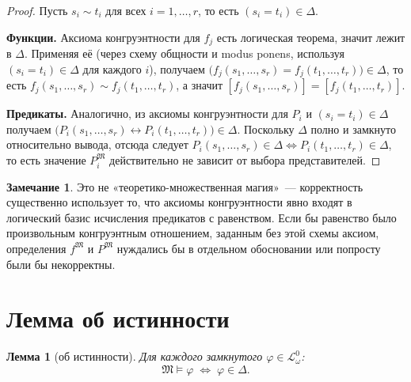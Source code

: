 \documentclass[12pt, a4paper]{article}
\theoremstyle{plain}
\newtheorem{lemma}[theorem]{Лемма}
\theoremstyle{definition}
\newtheorem{remark}[theorem]{Замечание}
\renewcommand{\models}{\vDash}
\newcommand{\Lw}{\mathcal{L}_\omega}
\newcommand{\Struct}{\mathfrak{M}}
\begin{document}
\begin{proof}
Пусть $s_i \sim t_i$ для всех $i = 1,\ldots,r$, то есть
$(s_i = t_i) \in \Delta$.

\textbf{Функции.} Аксиома конгруэнтности для $f_j$ есть логическая
теорема, значит лежит в $\Delta$. Применяя её (через схему общности
и modus ponens, используя $(s_i = t_i) \in \Delta$ для каждого $i$),
получаем
$\bigl(f_j(s_1,\ldots,s_r) = f_j(t_1,\ldots,t_r)\bigr) \in \Delta$,
то есть $f_j(s_1,\ldots,s_r) \sim f_j(t_1,\ldots,t_r)$, а значит
$[f_j(s_1,\ldots,s_r)] = [f_j(t_1,\ldots,t_r)]$.

\textbf{Предикаты.} Аналогично, из аксиомы конгруэнтности для $P_i$
и $(s_i=t_i)\in\Delta$ получаем
$\bigl(P_i(s_1,\ldots,s_r) \leftrightarrow P_i(t_1,\ldots,t_r)\bigr) \in \Delta$.
Поскольку $\Delta$ полно и замкнуто относительно вывода, отсюда следует
$P_i(s_1,\ldots,s_r) \in \Delta \iff P_i(t_1,\ldots,t_r) \in \Delta$,
то есть значение $P_i^{\Struct}$ действительно не зависит от выбора
представителей.
\end{proof}

\begin{remark}
Это не «теоретико-множественная магия»~--- корректность существенно
использует то, что аксиомы конгруэнтности явно входят в логический
базис исчисления предикатов с равенством. Если бы равенство было
произвольным конгруэнтным отношением, заданным без этой схемы аксиом,
определения $f^{\Struct}$ и $P^{\Struct}$ нуждались бы в отдельном
обосновании или попросту были бы некорректны.
\end{remark}

\section{Лемма об истинности}

\begin{lemma}[об истинности]\label{lem:truth}
Для каждого замкнутого $\varphi \in \Lw^0$:
\[
  \Struct \models \varphi \;\iff\; \varphi \in \Delta.
\]
\end{lemma}
\end{document}
